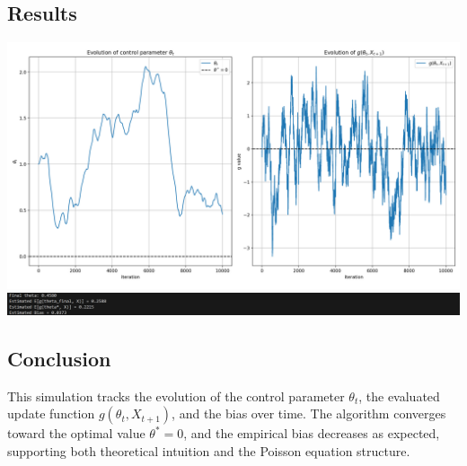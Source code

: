\documentclass[a4paper]{article}
\begin{document}
	 \subsection*{Results}
	 \begin{center}
	 	\includegraphics[scale=0.45]{fig1.png}
	 	\includegraphics[scale=0.5]{fig2.png}
	 \end{center}
	 
	 \subsection*{Conclusion}
	 
	 This simulation tracks the evolution of the control parameter \(\theta_t\), the evaluated update function \(g(\theta_t, X_{t+1})\), and the bias over time. The algorithm converges toward the optimal value \(\theta^* = 0\), and the empirical bias decreases as expected, supporting both theoretical intuition and the Poisson equation structure.
	 
	 
	
	
	
\end{document}
